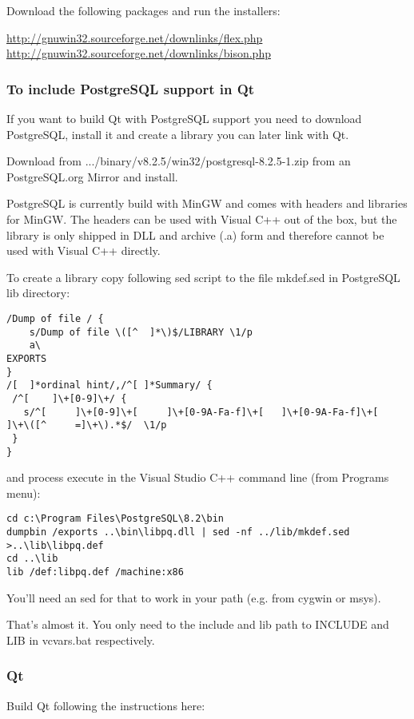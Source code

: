 Download the following packages and run the installers:

\url{http://gnuwin32.sourceforge.net/downlinks/flex.php} \\
\url{http://gnuwin32.sourceforge.net/downlinks/bison.php}

\subsubsection{To include  PostgreSQL support in Qt}
If you want to build Qt with PostgreSQL support you need to download
PostgreSQL, install it and create a library you can later link with Qt.

Download from .../binary/v8.2.5/win32/postgresql-8.2.5-1.zip from an
PostgreSQL.org Mirror and install.

PostgreSQL is currently build with MinGW and comes with headers and libraries
for MinGW.  The headers can be used with Visual C++ out of the box, but the library
is only shipped in DLL and archive (.a) form and therefore cannot be used with
Visual C++ directly.

To create a library copy following sed script to the file mkdef.sed in
PostgreSQL lib directory:

\begin{verbatim}
/Dump of file / {
	s/Dump of file \([^	 ]*\)$/LIBRARY \1/p
	a\
EXPORTS
}
/[ 	]*ordinal hint/,/^[	]*Summary/ {
 /^[ 	]\+[0-9]\+/ {
   s/^[ 	]\+[0-9]\+[ 	]\+[0-9A-Fa-f]\+[ 	]\+[0-9A-Fa-f]\+[ 	]\+\([^ 	=]\+\).*$/	\1/p
 }
}
\end{verbatim}

and process execute in the Visual Studio C++ command line (from Programs menu):

\begin{verbatim}
cd c:\Program Files\PostgreSQL\8.2\bin
dumpbin /exports ..\bin\libpq.dll | sed -nf ../lib/mkdef.sed >..\lib\libpq.def
cd ..\lib
lib /def:libpq.def /machine:x86
\end{verbatim}

You'll need an sed for that to work in your path (e.g. from cygwin or msys).

That's almost it. You only need to the include and lib path to INCLUDE and LIB in vcvars.bat respectively.

\subsubsection{Qt}
Build Qt following the instructions here:

